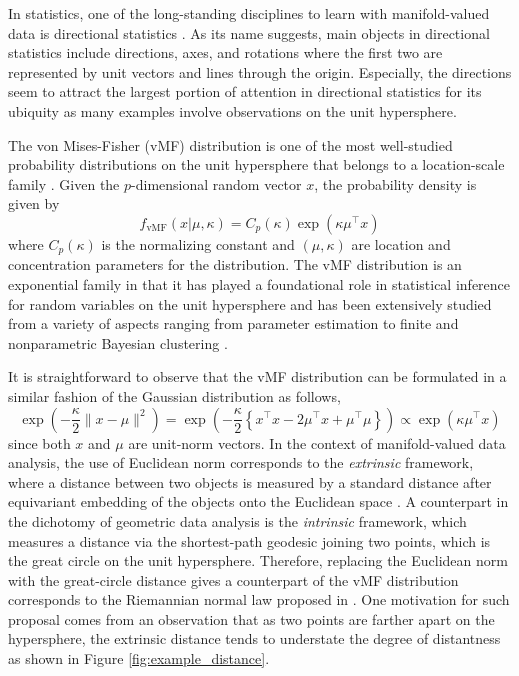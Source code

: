 \documentclass[11pt]{article}
\begin{document}
In statistics, one of the long-standing disciplines to learn with manifold-valued data is directional statistics  \citep{mardia_directional_2000, ley_modern_2017-1}. As its name suggests, main objects in directional statistics include directions, axes, and rotations where the first two are represented by unit vectors and lines through the origin. Especially, the directions seem to attract the largest portion of attention in directional statistics for its ubiquity as many examples involve observations on the unit hypersphere.


The von Mises-Fisher (vMF) distribution is one of the most well-studied probability distributions on the unit hypersphere that belongs to a location-scale family \citep{fisher_dispersion_1953, mardia_directional_2000}. Given the $p$-dimensional random vector $x$, the probability density is given by
\begin{equation}\label{def:density_vMF}
f_{\text{vMF}}(x|\mu,\kappa) = C_p (\kappa) \exp (\kappa \mu^\top x)
\end{equation}
where $C_p (\kappa)$ is the normalizing constant and $(\mu,\kappa)$ are location and concentration parameters for the distribution. The vMF distribution is an exponential family in that it has played a foundational role in statistical inference for random variables on the unit hypersphere and has been extensively studied from a variety of aspects ranging from parameter estimation \citep{jupp_maximum_1979, sra_short_2012} to finite and nonparametric Bayesian clustering \citep{banerjee_clustering_2005,hornik_movmf_2014, bhattacharya_nonparametric_2012-2}.


It is straightforward to observe that the vMF distribution can be formulated in a similar fashion of the Gaussian distribution as follows,
\begin{equation*}
\exp \left( -\frac{\kappa}{2} \|x-\mu\|^2 \right) = \exp \left( -\frac{\kappa}{2} \left\lbrace x^\top x - 2\mu^\top x + \mu^\top \mu \right\rbrace \right) \propto \exp \left(\kappa \mu^\top x\right)
\end{equation*}
since both $x$ and $\mu$ are unit-norm vectors. In the context of manifold-valued data analysis, the use of Euclidean norm corresponds to the \emph{extrinsic} framework, where a distance between two objects is measured by a standard distance after equivariant embedding of the objects onto the Euclidean space \citep{bhattacharya_nonparametric_2012-1}. A counterpart in the dichotomy of geometric data analysis is the \emph{intrinsic} framework, which measures a distance via the shortest-path geodesic joining two points, which is the great circle on the unit hypersphere. Therefore, replacing the Euclidean norm with the great-circle distance gives a counterpart of the vMF distribution corresponds to the Riemannian normal law proposed in \cite{pennec_intrinsic_2006}. One motivation for such proposal comes from an observation that as two points are farther apart on the hypersphere, the extrinsic distance tends to understate the degree of distantness as shown in Figure \ref{fig:example_distance}.
\end{document}
